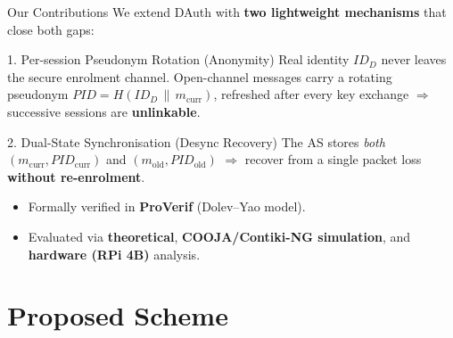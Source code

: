 \begin{frame}{Our Contributions}
    We extend DAuth with \textbf{two lightweight mechanisms} that close both gaps:

    \vspace{0.3cm}
    \begin{block}{1. Per-session Pseudonym Rotation (Anonymity)}
        Real identity $ID_D$ never leaves the secure enrolment channel.
        Open-channel messages carry a rotating pseudonym
        $\mathit{PID} = H(ID_D \,\|\, m_{\mathrm{curr}})$, refreshed after every key exchange
        $\Rightarrow$ successive sessions are \textbf{unlinkable}.
    \end{block}

    \begin{block}{2. Dual-State Synchronisation (Desync Recovery)}
        The AS stores \emph{both} $(m_{\mathrm{curr}}, \mathit{PID}_{\mathrm{curr}})$
        and $(m_{\mathrm{old}}, \mathit{PID}_{\mathrm{old}})$ $\Rightarrow$ recover from a single
        packet loss \textbf{without re-enrolment}.
    \end{block}

    \vspace{0.15cm}
    \begin{itemize}
        \item Formally verified in \textbf{ProVerif} (Dolev--Yao model).
        \item Evaluated via \textbf{theoretical}, \textbf{COOJA/Contiki-NG simulation}, and \textbf{hardware (RPi 4B)} analysis.
    \end{itemize}
\end{frame}

\section{Proposed Scheme}

